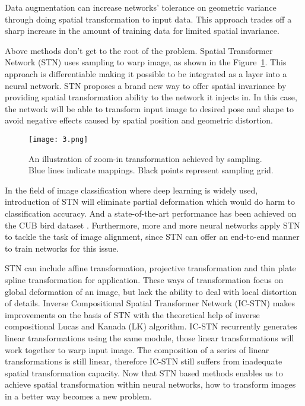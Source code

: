 \documentclass{article}
\begin{document}
Data augmentation can increase networks' tolerance on geometric variance through doing spatial transformation to input data.
This approach trades off a sharp increase in the amount of training data for limited spatial invariance.

Above methods don't get to the root of the problem.
Spatial Transformer Network (STN) \cite{jaderberg2015spatial} uses sampling to warp image, as shown in the Figure~\ref{fig:1}.
This approach is differentiable making it possible to be integrated as a layer into a neural network.
STN proposes a brand new way to offer spatial invariance  by providing spatial transformation ability to the network it injects in.
In this case, the network will be able to transform input image to desired pose and shape to avoid negative effects caused by spatial position and geometric distortion.
\begin{figure}[t]
    \centering
    \texttt{[image: 3.png]}
    \caption{\label{fig:1}An illustration of zoom-in transformation achieved by sampling. Blue lines indicate mappings. Black points represent sampling grid.}
\end{figure}

In the field of image classification where deep learning is widely used, introduction of STN will eliminate partial deformation which would do harm to classification accuracy.
And a state-of-the-art performance has been achieved on the CUB bird dataset \cite{wah2011caltech}.
Furthermore, more and more neural networks \cite{wu2017recursive,zhang2017deep,chang2017clkn,bhagavatula2017faster} apply STN to tackle the task of image alignment, since STN can offer an end-to-end manner to train networks for this issue.

STN can include affine transformation, projective transformation and thin plate spline transformation for application.
These ways of transformation focus on global deformation of an image, but lack the ability to deal with local distortion of details.
Inverse Compositional Spatial Transformer Network (IC-STN) \cite{lin2017inverse} makes improvements on the basis of STN  with the theoretical help of inverse compositional Lucas and Kanada (LK) algorithm.
IC-STN recurrently generates linear transformations using the same module, those linear transformations will work together to warp input image.
The composition of a series of linear transformations is still linear, therefore IC-STN still suffers from inadequate spatial transformation capacity.
Now that STN based methods enables us to achieve spatial transformation within neural networks, how to transform images in a better way becomes a new problem.
\end{document}
